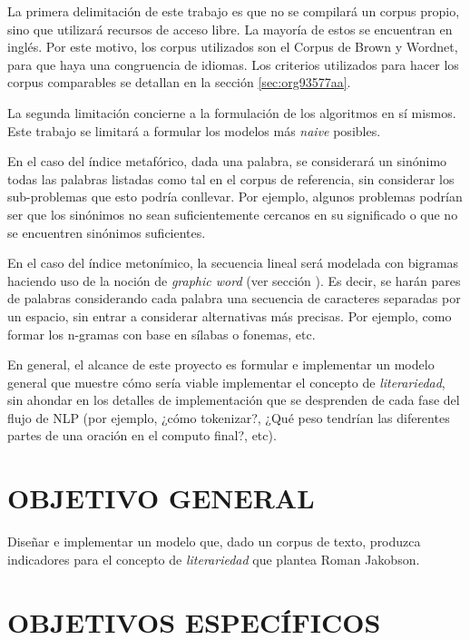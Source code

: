 \documentclass[12pt,letterpaper,twoside]{article}
\begin{document}
 La primera delimitación de este trabajo es que no se compilará un
corpus propio, sino que utilizará recursos de acceso libre. La mayoría
de estos se encuentran en inglés. Por este motivo, los corpus
utilizados son el Corpus de Brown y Wordnet, para que haya una
congruencia de idiomas. Los criterios utilizados para hacer los corpus
comparables se detallan en la sección \ref{sec:org93577aa}.

La segunda limitación concierne a la formulación de los algoritmos en
sí mismos. Este trabajo se limitará a formular los modelos más \emph{naive}
posibles.

En el caso del índice metafórico, dada una palabra, se considerará un
sinónimo todas las palabras listadas como tal en el corpus de
referencia, sin considerar los sub-problemas que esto podría
conllevar. Por ejemplo, algunos problemas podrían ser que los
sinónimos no sean suficientemente cercanos en su significado o que no
se encuentren sinónimos suficientes.

En el caso del índice metonímico, la secuencia lineal será modelada
con bigramas haciendo uso de la noción de \emph{graphic word} (ver sección
).  Es decir, se harán pares de palabras considerando cada
palabra una secuencia de caracteres separadas por un espacio, sin
entrar a considerar alternativas más precisas. Por ejemplo, como
formar los n-gramas con base en sílabas o fonemas, etc.

En general, el alcance de este proyecto es formular e implementar un
modelo general que muestre cómo sería viable implementar el concepto
de \emph{literariedad}, sin ahondar en los detalles de implementación que
se desprenden de cada fase del flujo de NLP (por ejemplo, ¿cómo
tokenizar?, ¿Qué peso tendrían las diferentes partes de una oración en
el computo final?, etc).

\section{OBJETIVO GENERAL}
\label{sec:org72fd0a8}
Diseñar e implementar un modelo que, dado un corpus de texto, produzca
indicadores para el concepto de \emph{literariedad} que plantea Roman Jakobson.

\section{OBJETIVOS ESPECÍFICOS}
\label{sec:orgc90ea2a}
\end{document}
